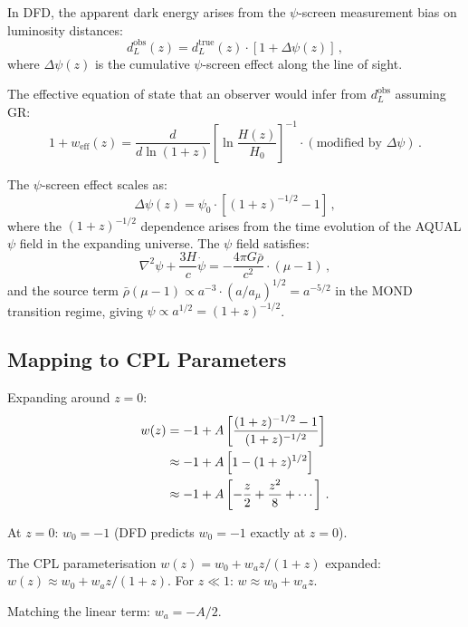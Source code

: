 \documentclass[11pt,a4paper]{article}
\begin{document}
In DFD, the apparent dark energy arises from the $\psi$-screen measurement bias on luminosity distances:
\begin{equation}
d_L^{\mathrm{obs}}(z) = d_L^{\mathrm{true}}(z) \cdot [1 + \Delta\psi(z)]\,,
\end{equation}
where $\Delta\psi(z)$ is the cumulative $\psi$-screen effect along the line of sight.

The effective equation of state that an observer would infer from $d_L^{\mathrm{obs}}$ assuming GR:
\begin{equation}
1 + w_{\mathrm{eff}}(z) = \frac{d}{d\ln(1+z)}\left[\ln\frac{H(z)}{H_0}\right]^{-1} \cdot (\text{modified by } \Delta\psi)\,.
\end{equation}

The $\psi$-screen effect scales as:
\begin{equation}
\Delta\psi(z) = \psi_0 \cdot [(1+z)^{-1/2} - 1]\,,
\end{equation}
where the $(1+z)^{-1/2}$ dependence arises from the time evolution of the AQUAL $\psi$ field in the expanding universe. The $\psi$ field satisfies:
\begin{equation}
\nabla^2\psi + \frac{3H}{c}\dot{\psi} = -\frac{4\pi G \bar{\rho}}{c^2} \cdot (\mu - 1)\,,
\end{equation}
and the source term $\bar{\rho}(\mu - 1) \propto a^{-3} \cdot (a/a_\mu)^{1/2} = a^{-5/2}$ in the MOND transition regime, giving $\psi \propto a^{1/2} = (1+z)^{-1/2}$.

\subsection{Mapping to CPL Parameters}

Expanding around $z = 0$:
\begin{align}
w(z) &= -1 + A\left[\frac{(1+z)^{-1/2} - 1}{(1+z)^{-1/2}}\right] \notag\\
&\approx -1 + A\left[1 - (1+z)^{1/2}\right] \notag\\
&\approx -1 + A\left[-\frac{z}{2} + \frac{z^2}{8} + \cdots\right]\,.
\end{align}

At $z = 0$: $w_0 = -1$ (DFD predicts $w_0 = -1$ exactly at $z = 0$).

The CPL parameterisation $w(z) = w_0 + w_a z/(1+z)$ expanded: $w(z) \approx w_0 + w_a z/(1+z)$. For $z \ll 1$: $w \approx w_0 + w_a z$.

Matching the linear term: $w_a = -A/2$.
\end{document}
